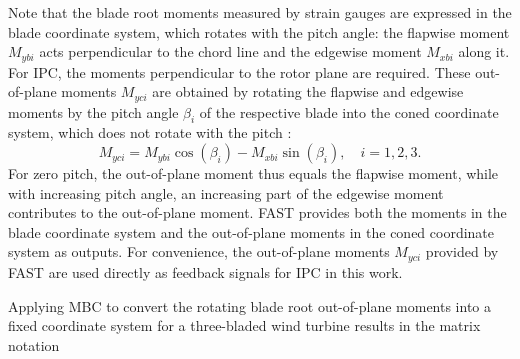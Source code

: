 Note that the blade root moments measured by strain gauges are expressed in the blade coordinate system, which rotates with the pitch angle: the flapwise moment $M_{ybi}$ acts perpendicular to the chord line and the edgewise moment $M_{xbi}$ along it. For IPC, the moments perpendicular to the rotor plane are required. These out-of-plane moments $M_{yci}$ are obtained by rotating the flapwise and edgewise moments by the pitch angle $\beta_i$ of the respective blade into the coned coordinate system, which does not rotate with the pitch \cite{jonkman2005fast}:
\begin{equation} \label{eq:MoopFAST}
    M_{yci} = M_{ybi} \cos(\beta_i) - M_{xbi} \sin(\beta_i), \quad i = 1, 2, 3.
\end{equation}
For zero pitch, the out-of-plane moment thus equals the flapwise moment, while with increasing pitch angle, an increasing part of the edgewise moment contributes to the out-of-plane moment. FAST provides both the moments in the blade coordinate system and the out-of-plane moments in the coned coordinate system as outputs. For convenience, the out-of-plane moments $M_{yci}$ provided by FAST are used directly as feedback signals for IPC in this work.

Applying MBC to convert the rotating blade root out-of-plane moments into a fixed coordinate system for a three-bladed wind turbine results in the matrix notation 


